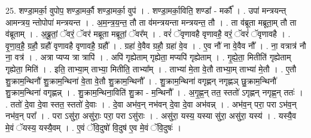 \documentclass[17pt]{extarticle}
\begin{document}
25. शण्डा॒मर्का॒ वुपोप॒ शण्डा॒मर्कौ॒ शण्डा॒मर्का॒ वुप॑ । . शण्डा॒मर्का॒विति॒ शण्डा᳚ - मर्कौ᳚ । . उपा॑ मन्त्रयन्त् आमन्त्रय॒ न्तोपोपा॑ मन्त्रयन्त । . अ॒म॒न्त्र॒य॒न्त॒ तौ ता व॑मन्त्रयन्ता मन्त्रयन्त॒ तौ । . ता व॑ब्रूता मब्रूता॒म् तौ ता व॑ब्रूताम् । . अ॒ब्रू॒तां॒ ॅवरं॒ ॅवर॑ मब्रूता मब्रूतां॒ ॅवर᳚म् । . वरं॑ ॅवृणावहै वृणावहै॒ वरं॒ ॅवरं॑ ॅवृणावहै । . वृ॒णा॒व॒है॒ ग्रहौ॒ ग्रहौ॑ वृणावहै वृणावहै॒ ग्रहौ᳚ । . ग्रहा॑ वे॒वैव ग्रहौ॒ ग्रहा॑ वे॒व । . ए॒व नौ॑ ना वे॒वैव नौ᳚ । . ना॒ वत्रात्र॑ नौ ना॒ वत्र॑ । . अत्रा प्यप्य त्रा त्रापि॑ । . अपि॑ गृह्येताम् गृह्येता॒ मप्यपि॑ गृह्येताम् । . गृ॒ह्ये॒ता॒ मितीति॑ गृह्येताम् गृह्येता॒ मिति॑ । . इति॒ ताभ्या॒म् ताभ्या॒ मितीति॒ ताभ्या᳚म् । . ताभ्या॑ मे॒ता वे॒तौ ताभ्या॒म् ताभ्या॑ मे॒तौ । . ए॒तौ शु॒क्राम॒न्थिनौ॑ शु॒क्राम॒न्थिना॑ वे॒ता वे॒तौ शु॒क्राम॒न्थिनौ᳚ । . शु॒क्राम॒न्थिना॑ वगृह्णन् नगृह्णञ् छु॒क्राम॒न्थिनौ॑ शु॒क्राम॒न्थिना॑ वगृह्णन्न् । . शु॒क्राम॒न्थिना॒विति॑ शु॒क्रा - म॒न्थिनौ᳚ । . अ॒गृ॒ह्ण॒न् तत॒ स्ततो॑ ऽगृह्णन् नगृह्ण॒न् ततः॑ । . ततो॑ दे॒वा दे॒वा स्तत॒ स्ततो॑ दे॒वाः । . दे॒वा अभ॑व॒न् नभ॑वन् दे॒वा दे॒वा अभ॑वन्न् । . अभ॑व॒न् परा॒ परा ऽभ॑व॒न् नभ॑व॒न् परा᳚ । . परा ऽसु॑रा॒ असु॑राः॒ परा॒ परा ऽसु॑राः । . असु॑रा॒ यस्य॒ यस्या सु॑रा॒ असु॑रा॒ यस्य॑ । . यस्यै॒व मे॒वं ॅयस्य॒ यस्यै॒वम् । . ए॒वं ॅवि॒दुषो॑ वि॒दुष॑ ए॒व मे॒वं ॅवि॒दुषः॑ । \newline
\end{document}
